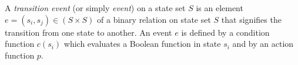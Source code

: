 \documentclass[12pt]{article}
\begin{document}
A \emph{transition event} (or simply \emph{event}) on a state set $S$ is an element $e = (s_i, s_j) \in (S\times S)$ of a binary relation on state set $S$ that signifies the transition from one state to another.  An event $e$ is defined by a condition function $c(s_i)$ which evaluates a Boolean function in state $s_i$ and by an action function $p$.
\end{document}
